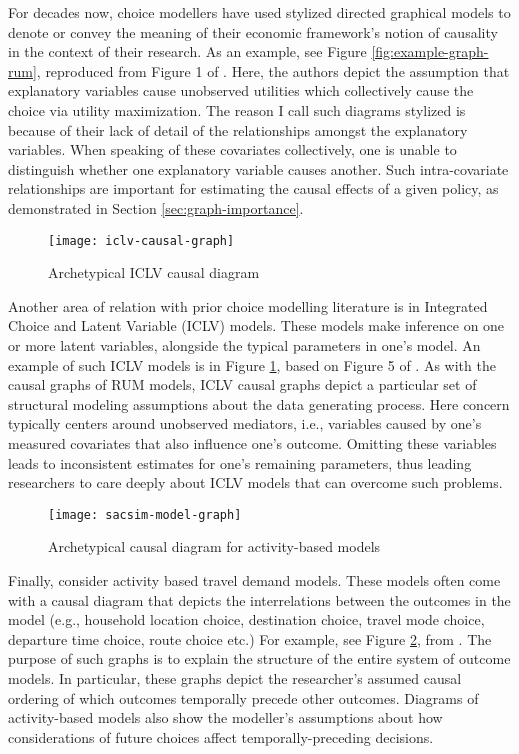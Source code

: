 For decades now, choice modellers have used stylized directed graphical models to denote or convey the meaning of their economic framework's notion of causality in the context of their research.
As an example, see Figure \ref{fig:example-graph-rum}, reproduced from Figure 1 of \citet{ben_2002_integration}.
Here, the authors depict the assumption that explanatory variables cause unobserved utilities which collectively cause the choice via utility maximization.
The reason I call such diagrams stylized is because of their lack of detail of the relationships amongst the explanatory variables.
When speaking of these covariates collectively, one is unable to distinguish whether one explanatory variable causes another.
Such intra-covariate relationships are important for estimating the causal effects of a given policy, as demonstrated in Section \ref{sec:graph-importance}.

\begin{figure}
   \centering
   \texttt{[image: iclv-causal-graph]}
   \caption{Archetypical ICLV causal diagram}
   \label{fig:example-graph-iclv}
\end{figure}

Another area of relation with prior choice modelling literature is in Integrated Choice and Latent Variable (ICLV) models.
These models make inference on one or more latent variables, alongside the typical parameters in one's model.
An example of such ICLV models is in Figure \ref{fig:example-graph-iclv}, based on Figure 5 of \citet{ben_2002_integration}.
As with the causal graphs of RUM models, ICLV causal graphs depict a particular set of structural modeling assumptions about the data generating process.
Here concern typically centers around unobserved mediators, i.e., variables caused by one's measured covariates that also influence one's outcome.
Omitting these variables leads to inconsistent estimates for one's remaining parameters, thus leading researchers to care deeply about ICLV models that can overcome such problems.

\begin{figure}
   \centering
   \texttt{[image: sacsim-model-graph]}
   \caption{Archetypical causal diagram for activity-based models}
   \label{fig:example-graph-abm}
\end{figure}

Finally, consider activity based travel demand models.
These models often come with a causal diagram that depicts the interrelations between the outcomes in the model (e.g., household location choice, destination choice, travel mode choice, departure time choice, route choice etc.)
For example, see Figure \ref{fig:example-graph-abm}, from \citet[Fig.1]{bradley_2010_sacsim}.
The purpose of such graphs is to explain the structure of the entire system of outcome models.
In particular, these graphs depict the researcher's assumed causal ordering of which outcomes temporally precede other outcomes.
Diagrams of activity-based models also show the modeller's assumptions about how considerations of future choices affect temporally-preceding decisions.

